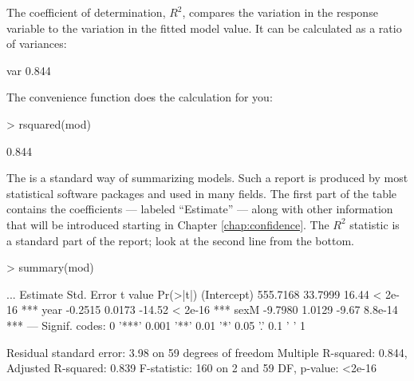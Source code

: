 


The coefficient of determination, $R^2$, 
compares the variation in the response variable to the variation
in the fitted model value.  It can be calculated as a ratio of variances: \datasetSwimming
\begin{Schunk}
\begin{Soutput}
  var 
0.844 
\end{Soutput}
\end{Schunk}

The convenience function  does the calculation for you:
\begin{Schunk}
\begin{Sinput}
> rsquared(mod)
\end{Sinput}
\begin{Soutput}
[1] 0.844
\end{Soutput}
\end{Schunk}

The  is a standard way of summarizing
models.  Such a report is produced by most statistical software
packages and used in many fields.  The first part of the table
contains the coefficients --- labeled ``Estimate'' --- along with
other information that will be introduced starting in Chapter
\ref{chap:confidence}.  The $R^2$ statistic is a standard part of the
report; look at the second line from the bottom.
\begin{Schunk}
\begin{Sinput}
> summary(mod)
\end{Sinput}
\begin{Soutput}
...
            Estimate Std. Error t value Pr(>|t|)    
(Intercept) 555.7168    33.7999   16.44  < 2e-16 ***
year         -0.2515     0.0173  -14.52  < 2e-16 ***
sexM         -9.7980     1.0129   -9.67  8.8e-14 ***
---
Signif. codes:  0 '***' 0.001 '**' 0.01 '*' 0.05 '.' 0.1 ' ' 1 

Residual standard error: 3.98 on 59 degrees of freedom
Multiple R-squared: 0.844,	Adjusted R-squared: 0.839 
F-statistic:  160 on 2 and 59 DF,  p-value: <2e-16 
\end{Soutput}
\end{Schunk}


